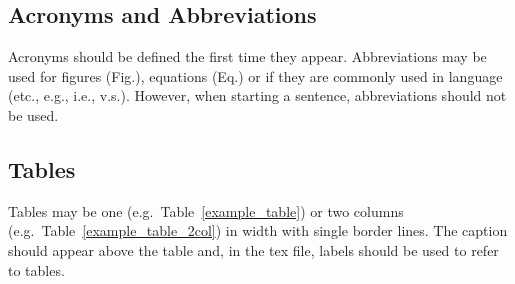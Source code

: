 \subsection{Acronyms and Abbreviations}
Acronyms should be defined the first time they appear.  
Abbreviations may be used for figures (Fig.), equations (Eq.) 
or if they are commonly used in language (etc., e.g., i.e., v.s.).
However, when starting a sentence, abbreviations should not be used.

\subsection{Tables}
Tables may be one (e.g.~Table~\ref{example_table})
or two columns (e.g.~Table~\ref{example_table_2col})
in width with single border lines.
The caption should appear above the table and, 
in the tex file, labels should be used to refer to tables.

%

